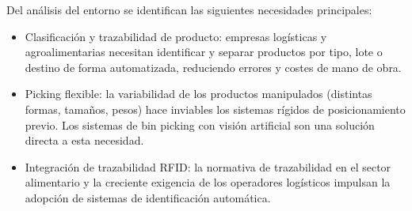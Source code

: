 Del análisis del entorno se identifican las siguientes necesidades principales:

\begin{itemize}
	\item Clasificación y trazabilidad de producto: empresas logísticas y agroalimentarias necesitan identificar y separar productos por tipo, lote o destino de forma automatizada, reduciendo errores y costes de mano de obra.

	\item Picking flexible: la variabilidad de los productos manipulados (distintas formas, tamaños, pesos) hace inviables los sistemas rígidos de posicionamiento previo. Los sistemas de bin picking con visión artificial son una solución directa a esta necesidad.

	\item Integración de trazabilidad RFID: la normativa de trazabilidad en el sector alimentario y la creciente exigencia de los operadores logísticos impulsan la adopción de sistemas de identificación automática.
\end{itemize}
